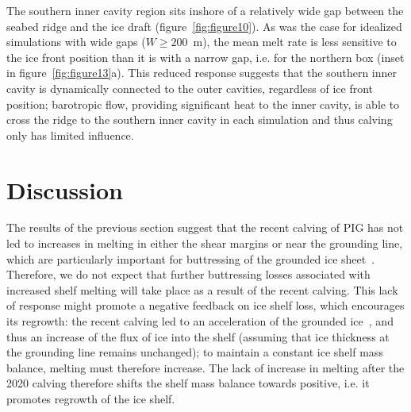\documentclass[draft]{agujournal2019}
\begin{document}

The southern inner cavity region sits inshore of a relatively wide gap between the seabed ridge and the ice draft (figure~\ref{fig:figure10}). As was the case for idealized simulations with wide gaps ($W\geq200$~m), the mean melt rate is less sensitive to the ice front position than it is with a narrow gap, i.e. for the northern box (inset in figure~\ref{fig:figure13}a). This reduced response suggests that the southern inner cavity is dynamically connected to the outer cavities, regardless of ice front position; barotropic flow, providing significant heat to the inner cavity, is able to cross the ridge to the southern inner cavity in each simulation and thus calving only has limited influence. 



\section{Discussion}\label{S:Discussion}
The results of the previous section suggest that the recent calving of PIG has not led to increases in melting in either the shear margins or near the grounding line, which are particularly important for buttressing of the grounded ice sheet~\cite{Furst2016NatureClimCh, Reese2018NatureClimCh}. Therefore, we do not expect that further buttressing losses associated with increased shelf melting will take place as a result of the recent calving. This lack of response might promote a negative feedback on ice shelf loss, which encourages its regrowth: the recent calving led to an acceleration of the grounded ice~\cite{Joughin2021ScienceAdv}, and thus an increase of the flux of ice into the shelf (assuming that ice thickness at the grounding line remains unchanged); to maintain a constant ice shelf mass balance, melting must therefore increase. The lack of increase in melting after the 2020 calving therefore shifts the shelf mass balance towards positive, i.e. it promotes regrowth of the ice shelf.
\end{document}

